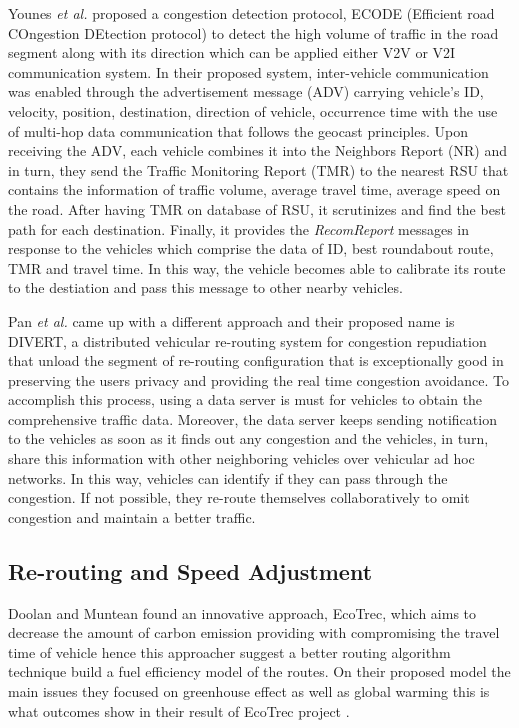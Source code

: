 \documentclass[conference]{IEEEtran}
\begin{document}
Younes \textit{et al.} \cite{younes2013efficient} proposed a congestion detection protocol, ECODE  (Efficient  road COngestion  DEtection  protocol) to detect the high volume of traffic in the road segment along with its direction which can be applied either V2V or V2I communication system. In their proposed system, inter-vehicle communication was enabled through the advertisement message (ADV) carrying vehicle's ID, velocity, position, destination, direction of vehicle, occurrence time with the use of multi-hop data communication that follows the geocast principles. Upon receiving the ADV, each vehicle combines it into the Neighbors Report (NR) and in turn, they send the Traffic Monitoring Report  (TMR) to the nearest RSU that contains the information of traffic volume, average travel time, average speed on the road. After having TMR on database of RSU, it scrutinizes and find the best path for each destination. Finally, it provides the \textit{RecomReport} messages in response to the vehicles which comprise the data of ID, best roundabout route, TMR and travel time. In this way, the vehicle becomes able to calibrate its route to the destiation and pass this message to other nearby vehicles.

Pan \textit{et al.} \cite{pan2017divert} came up with a different approach and their proposed name is DIVERT, a distributed vehicular re-routing system for congestion repudiation that unload the segment of re-routing configuration that is exceptionally good in preserving the users privacy and providing the real time congestion avoidance. To accomplish this process, using a data server is must for vehicles to obtain the comprehensive traffic data. Moreover, the data server keeps sending notification to the vehicles as soon as it finds out any congestion and the vehicles, in turn, share this information with other neighboring vehicles over vehicular ad hoc networks. In this way, vehicles can identify if they can pass through the congestion. If not possible, they re-route themselves collaboratively to omit congestion and maintain a better traffic.




\subsection{Re-routing and Speed Adjustment}
Doolan and Muntean found an innovative approach, EcoTrec, which aims to decrease the amount of carbon emission providing with compromising the travel time of vehicle hence this approacher suggest a better routing algorithm technique build a fuel efficiency model of the routes. On their proposed model the main issues they focused on greenhouse effect as well as global warming this is what outcomes show in their result of EcoTrec project \cite{doolan2016ecotrec}.
\end{document}

